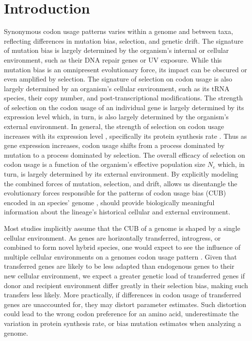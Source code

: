 \documentclass[fleqn,letterpaper]{article}
\begin{document}
\section*{Introduction}
Synonymous codon usage patterns varies within a genome and between taxa, reflecting differences in mutation bias, selection, and genetic drift.
The signature of mutation bias is largely determined by the organism's internal or cellular environment, such as their DNA repair genes or UV exposure.
While this mutation bias is an omnipresent evolutionary force, its impact can be obscured or even amplified by selection. 
The signature of selection on codon usage is also largely determined by an organism's cellular environment, such as its tRNA species, their copy number, and post-transcriptional modifications.
The strength of selection on the codon usage of an individual gene is largely determined by its expression level which, in turn, is also largely determined by the organism's external environment.
In general, the strength of selection on codon usage increases with its expression level \citep{gouy1982, ikemura1985, bulmer1990}, specifically its protein synthesis rate \citep{gilchrist2007}.
Thus as gene expression increases, codon usage shifts from a process dominated by mutation to a process dominated by selection.
The overall efficacy of selection on codon usage is a function of the organism's effective population size $N_e$ which, in turn, is largely determined by its external environment.
By explicitly modeling the combined forces of mutation, selection, and drift, \ROC allows us disentangle the evolutionary forces responsible for the patterns of codon usage bias (CUB) encoded in an species' genome \citep{gilchrist2007, ShahAndGilchrist2011, wallace2013, gilchrist2015}, should provide biologically meaningful information about the lineage's historical cellular and external environment.

Most studies implicitly assume that the CUB of a genome is shaped by a single cellular environment. 
As genes are horizontally transferred, introgress, or combined to form novel hybrid species, one would expect to see the influence of multiple cellular environments on a genomes codon usage pattern \citep{medigue1991,lawrence1997}.
Given that transferred genes are likely to be less adapted than endogenous genes to their new cellular environment, we expect a greater genetic load of transferred genes if donor and recipient environment differ greatly in their selection bias, making such transfers less likely.
More practically, if differences in codon usage of transferred genes are unaccounted for, they may distort parameter estimates.
Such distortion could lead to the wrong codon preference for an amino acid, underestimate the variation in protein synthesis rate, or bias mutation estimates when analyzing a genome.
\end{document}
